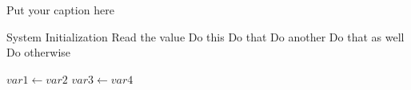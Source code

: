 \begin{algorithm}
	\caption{Put your caption here}
	\begin{algorithmic}[1]
		
		\State System Initialization
		\State Read the value 
		\State Do this
		\State Do that
		\State Do another
		\State Do that as well
		\Else
		\State Do otherwise
		\EndIf
		\EndIf
		
		  
		\State $var1 \leftarrow var2$  
		\State $var3 \leftarrow var4$
		\EndWhile  \label{roy's loop}
		
	\end{algorithmic}
\end{algorithm}